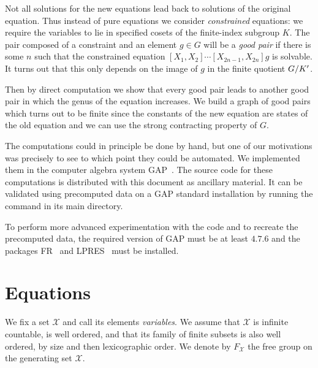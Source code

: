 \documentclass[a4paper,11pt]{amsart}
\begin{document}
Not all solutions for the new equations lead back to solutions of the
original equation. Thus instead of pure equations we consider
\emph{constrained} equations: we require the variables to lie in
specified cosets of the finite-index subgroup $K$. The pair composed
of a constraint and an element $g\in G$ will be a \emph{good pair} if
there is some $n$ such that the constrained equation
$[X_1,X_2]\cdots[X_{2n-1},X_{2n}]g$ is solvable.  It turns out that
this only depends on the image of $g$ in the finite quotient
${G/K'}$.

Then by direct computation we show that every good pair leads to
another good pair in which the genus of the equation increases.  We
build a graph of good pairs which turns out to be finite since the
constants of the new equation are states of the old equation and we
can use the strong contracting property of $G$.

The computations could in principle be done by hand, but one of our
motivations was precisely to see to which point they could be
automated. We implemented them in the computer algebra system
GAP~\cite{GAP4}. The source code for these computations is distributed
with this document as ancillary material. It can be validated using
precomputed data on a GAP standard installation by running the command
 in its main directory.

To perform more advanced experimentation with the code and to recreate
the precomputed data, the required version of GAP must be at least
$4.7.6$ and the packages FR~\cite{FR2.3.6} and LPRES~\cite{LPRES0.3.0}
must be installed.

\section{Equations}
We fix a set $\mathcal{X}$ and call its elements \emph{variables}.  We
assume that $\mathcal{X}$ is infinite countable, is well ordered, and
that its family of finite subsets is also well ordered, by size and
then lexicographic order. We denote by $F_{\mathcal{X}}$ the free
group on the generating set $\mathcal{X}$.
\end{document}
